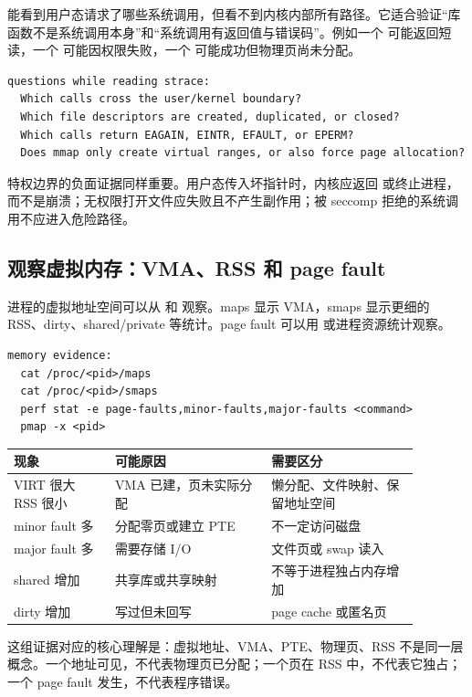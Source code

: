  能看到用户态请求了哪些系统调用，但看不到内核内部所有路径。它适合验证“库函数不是系统调用本身”和“系统调用有返回值与错误码”。例如一个  可能返回短读，一个  可能因权限失败，一个  可能成功但物理页尚未分配。

\begin{lstlisting}
questions while reading strace:
  Which calls cross the user/kernel boundary?
  Which file descriptors are created, duplicated, or closed?
  Which calls return EAGAIN, EINTR, EFAULT, or EPERM?
  Does mmap only create virtual ranges, or also force page allocation?
\end{lstlisting}

特权边界的负面证据同样重要。用户态传入坏指针时，内核应返回  或终止进程，而不是崩溃；无权限打开文件应失败且不产生副作用；被 seccomp 拒绝的系统调用不应进入危险路径。

\subsection{观察虚拟内存：VMA、RSS 和 page fault}

进程的虚拟地址空间可以从  和  观察。maps 显示 VMA，smaps 显示更细的 RSS、dirty、shared/private 等统计。page fault 可以用  或进程资源统计观察。

\begin{lstlisting}
memory evidence:
  cat /proc/<pid>/maps
  cat /proc/<pid>/smaps
  perf stat -e page-faults,minor-faults,major-faults <command>
  pmap -x <pid>
\end{lstlisting}

\begin{longtable}{p{0.22\linewidth}p{0.34\linewidth}p{0.32\linewidth}}
\toprule
现象 & 可能原因 & 需要区分 \\
\midrule
VIRT 很大 RSS 很小 & VMA 已建，页未实际分配 & 懒分配、文件映射、保留地址空间 \\
minor fault 多 & 分配零页或建立 PTE & 不一定访问磁盘 \\
major fault 多 & 需要存储 I/O & 文件页或 swap 读入 \\
shared 增加 & 共享库或共享映射 & 不等于进程独占内存增加 \\
dirty 增加 & 写过但未回写 & page cache 或匿名页 \\
\bottomrule
\end{longtable}

这组证据对应的核心理解是：虚拟地址、VMA、PTE、物理页、RSS 不是同一层概念。一个地址可见，不代表物理页已分配；一个页在 RSS 中，不代表它独占；一个 page fault 发生，不代表程序错误。


